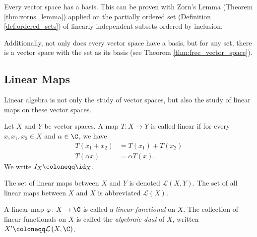 \begin{remark}
  Every vector space has a basis. This can be proven with Zorn's Lemma (Theorem \ref{thm:zorns_lemma}) applied on the partially ordered set (Definition \ref{def:ordered_sets}) of linearly independent subsets ordered by inclusion.\newline

  Additionally, not only does every vector space have a basis, but for any set, there is a vector space with the set as its basis (see Theorem \ref{thm:free_vector_space}).
\end{remark}
\subsection{Linear Maps}%
Linear algebra is not only the study of vector spaces, but also the study of linear maps on these vector spaces. 
\begin{definition}
  Let $X$ and $Y$ be vector spaces. A map $T\colon X\rightarrow Y$ is called linear if for every $x,x_1,x_2\in X$ and $\alpha\in \C$, we have
  \begin{align*}
    T\left(x_1 + x_2\right) &= T\left(x_1\right) + T\left(x_2\right)\\
    T\left(\alpha x\right) &= \alpha T\left(x\right).
  \end{align*}
  We write $I_{X} \coloneq \id_{X}$.\newline

  The set of linear maps between $X$ and $Y$ is denoted $\mathcal{L}\left(X,Y\right)$. The set of all linear maps between $X$ and $X$ is abbreviated $\mathcal{L}\left(X\right)$.\newline

  A linear map $\varphi\colon X\rightarrow \C$ is called a \textit{linear functional} on $X$. The collection of linear functionals on $X$ is called the \textit{algebraic dual} of $X$, written $X' \coloneq \mathcal{L}\left(X,\C\right)$.
\end{definition}

